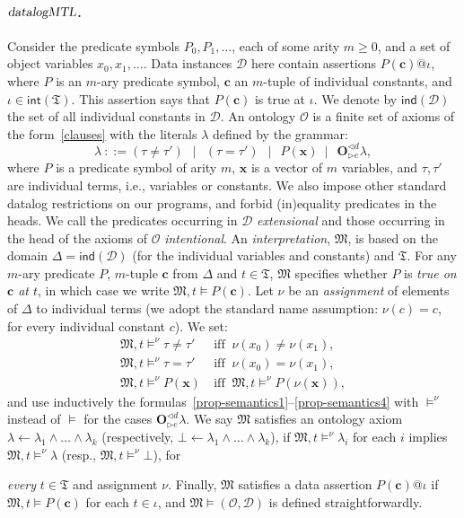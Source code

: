 \documentclass{article}
\newcommand{\ind}{\mathsf{ind}}
\newcommand{\Mmf}{\mathfrak{M}}
\newcommand{\avec}[1]{\boldsymbol{#1}}
\renewcommand{\int}{\mathsf{int}}
\newcommand{\D}{\mathcal{D}}
\renewcommand{\O}{\mathcal{O}}
\newcommand{\dMTL}{\textsl{datalogMTL}}
\begin{document}
{\paragraph{$\dMTL$.}\hspace*{-2mm} Consider the predicate symbols $P_0, P_1,
\dots$, each of some arity $m \geq 0$, and a set of object variables $x_0, x_1, \dots$. Data instances $\D$ here contain assertions $P(\avec{c})@\iota$, where $P$ is an $m$-ary predicate symbol, $\avec{c}$ an $m$-tuple of individual constants, and $\iota \in \int(\mathfrak{T})$. This assertion says that $P(\avec{c})$ is true at $\iota$. We denote by $\ind(\D)$ the set of all individual constants in $\D$. An ontology $\O$ is a finite set of axioms of the form~\eqref{clauses} with the literals $\lambda$ defined by the grammar:
%
$$\lambda \ ::= (\tau \neq \tau')\ \ \mid \ \ (\tau = \tau')\ \ \mid \ \ P(\avec{x}) \ \mid \ \ \mathbf{O}^{\lhd d}_{\rhd e} \lambda,$$
%
where $P$ is a predicate symbol of arity $m$, $\avec{x}$ is a vector of $m$ variables, and $\tau,\tau'$ are individual terms, i.e., variables or constants. We also impose other standard datalog  restrictions on our programs, and forbid (in)equality predicates in the heads. We call the predicates occurring in $\D$ \emph{extensional} and those occurring in the head of the axioms of $\O$ \emph{intentional}.
%
An \emph{interpretation}, $\Mmf$, is based on the domain $\Delta = \ind(\D)$ (for the individual variables and constants) and $\mathfrak T$. For any $m$-ary predicate $P$, $m$-tuple $\avec{c}$ from $\Delta$ and $t \in \mathfrak{T}$, $\Mmf$ specifies whether $P$ is \emph{true on $\avec{c}$ at $t$}, in which case we write $\Mmf,t \models P(\avec{c})$. Let $\nu$ be an \emph{assignment} of elements of $\Delta$ to individual terms (we adopt the standard name assumption: $\nu(c) = c$, for every individual constant $c$). We set:
%
\begin{align*}
 \Mmf, t \models^\nu \tau \ne \tau' \ &\text{iff } \  \nu(x_0) \ne \nu(x_1),\\
%
\Mmf, t \models^\nu \tau = \tau' \ &\text{iff } \  \nu(x_0) = \nu(x_1),\\
%
 \Mmf, t \models^\nu  P(\avec{x}) \ &\text{iff }\ \Mmf, t \models^\nu P(\nu(\avec{x})),
%
\end{align*}
%
and use inductively the formulas~\eqref{prop-semantics1}--\eqref{prop-semantics4}
with $\models^\nu$ instead of $\models$ for the cases $\mathbf{O}^{\lhd d}_{\rhd e} \lambda$. We say $\Mmf$ satisfies an ontology axiom $\lambda \leftarrow \lambda_1 \land \dots \land \lambda_k$ (respectively, $\bot \leftarrow \lambda_1 \land \dots \land \lambda_k$), if $\Mmf, t \models^\nu \lambda_i$ for each $i$ implies $\Mmf, t \models^\nu \lambda$ (resp., $\Mmf, t \models^\nu \bot$), for {\emph{every} $t \in \mathfrak{T}$ and assignment $\nu$. Finally, $\Mmf$ satisfies a data assertion $P(\avec{c})@\iota$ if $\Mmf, t \models P(\avec{c})$ for each $t \in \iota$, and $\Mmf \models (\O, \D)$ is defined straightforwardly.

}}
\end{document}
